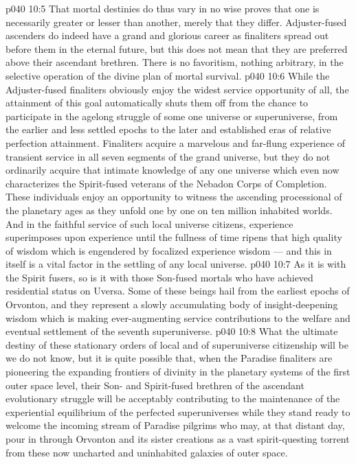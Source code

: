 \vs p040 10:5 \pc That mortal destinies do thus vary in no wise proves that one is necessarily greater or lesser than another, merely that they differ. Adjuster\hyp{}fused ascenders do indeed have a grand and glorious career as finaliters spread out before them in the eternal future, but this does not mean that they are preferred above their ascendant brethren. There is no favoritism, nothing arbitrary, in the selective operation of the divine plan of mortal survival.
\vs p040 10:6 \pc While the Adjuster\hyp{}fused finaliters obviously enjoy the widest service opportunity of all, the attainment of this goal automatically shuts them off from the chance to participate in the agelong struggle of some one universe or superuniverse, from the earlier and less settled epochs to the later and established eras of relative perfection attainment. Finaliters acquire a marvelous and far\hyp{}flung experience of transient service in all seven segments of the grand universe, but they do not ordinarily acquire that intimate knowledge of any one universe which even now characterizes the Spirit\hyp{}fused veterans of the Nebadon Corps of Completion. These individuals enjoy an opportunity to witness the ascending processional of the planetary ages as they unfold one by one on ten million inhabited worlds. And in the faithful service of such local universe citizens, experience superimposes upon experience until the fullness of time ripens that high quality of wisdom which is engendered by focalized experience  wisdom --- and this in itself is a vital factor in the settling of any local universe.
\vs p040 10:7 As it is with the Spirit fusers, so is it with those Son\hyp{}fused mortals who have achieved residential status on Uversa. Some of these beings hail from the earliest epochs of Orvonton, and they represent a slowly accumulating body of insight\hyp{}deepening wisdom which is making ever\hyp{}augmenting service contributions to the welfare and eventual settlement of the seventh superuniverse.
\vs p040 10:8 \pc What the ultimate destiny of these stationary orders of local and of superuniverse citizenship will be we do not know, but it is quite possible that, when the Paradise finaliters are pioneering the expanding frontiers of divinity in the planetary systems of the first outer space level, their Son\hyp{} and Spirit\hyp{}fused brethren of the ascendant evolutionary struggle will be acceptably contributing to the maintenance of the experiential equilibrium of the perfected superuniverses while they stand ready to welcome the incoming stream of Paradise pilgrims who may, at that distant day, pour in through Orvonton and its sister creations as a vast spirit\hyp{}questing torrent from these now uncharted and uninhabited galaxies of outer space.
